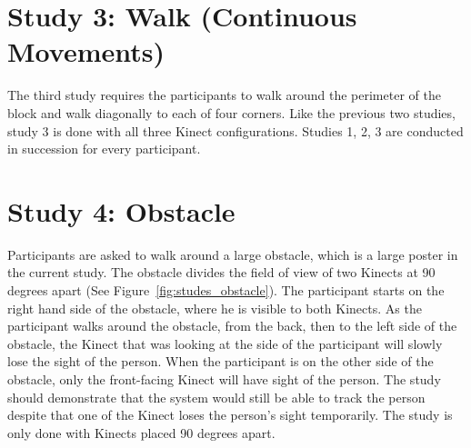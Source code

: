 \section{Study 3: Walk (Continuous Movements)}
\label{sec:studies_stationary}

The third study requires the participants to walk around the perimeter of the block and walk diagonally to each of four corners. Like the previous two studies, study 3 is done with all three Kinect configurations. Studies 1, 2, 3 are conducted in succession for every participant.

\section{Study 4: Obstacle}
\label{sec:studies_stationary}

Participants are asked to walk around a large obstacle, which is a large poster in the current study. The obstacle divides the field of view of two Kinects at 90 degrees apart (See Figure~\ref{fig:studes_obstacle}). The participant starts on the right hand side of the obstacle, where he is visible to both Kinects. As the participant walks around the obstacle, from the back, then to the left side of the obstacle, the Kinect that was looking at the side of the participant will slowly lose the sight of the person. When the participant is on the other side of the obstacle, only the front-facing Kinect will have sight of the person. The study should demonstrate that the system would still be able to track the person despite that one of the Kinect loses the person's sight temporarily. The study is only done with Kinects placed 90 degrees apart.

